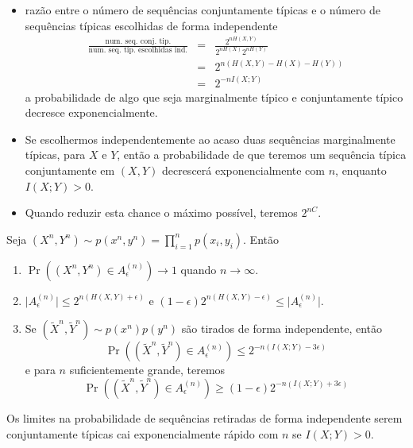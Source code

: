 \begin{frame}[allowframebreaks]
  \begin{itemize}
  \item razão entre o número de sequências conjuntamente típicas e o número de sequências típicas escolhidas de forma independente 
	\begin{eqnarray}
	\frac{\text{num. seq. conj. tip.}}{\text{num. seq. tip. escolhidas ind.}} &=& \frac{2^{nH(X,Y)}}{2^{nH(X)}2^{nH(Y)}} \nonumber \\
		&=& 2^{n(H(X,Y)-H(X)-H(Y))} \nonumber \\
		&=& 2^{-nI(X;Y)}
	\end{eqnarray}
  a probabilidade de algo que seja marginalmente típico e conjuntamente típico decresce exponencialmente.
  \item Se escolhermos independentemente ao acaso duas sequências marginalmente típicas, para $X$ e $Y$, então
	a probabilidade de que teremos um sequência típica conjuntamente em $(X,Y)$ decrescerá exponencialmente com $n$,
	enquanto $I(X;Y) > 0$.
  \item Quando reduzir esta chance o máximo possível, teremos $2^{nC}$.
  \end{itemize}

  \framebreak

  \begin{theorem}
  Seja $(X^n,Y^n) \sim p(x^n,y^n) = \prod_{i=1}^n p(x_i , y_i)$. Então
  \begin{enumerate}
  \item $\Pr \left( (X^n,Y^n) \in A_{\epsilon}^{(n)} \right) \rightarrow 1$ quando $n \rightarrow \infty$.
  \item $\vert A_{\epsilon}^{(n)} \vert \leq 2^{n(H(X,Y)+\epsilon)}$ e $(1-\epsilon) 2^{n(H(X,Y)-\epsilon)} \leq \vert A_{\epsilon}^{(n)} \vert$.
  \item Se $(\tilde{X}^n, \tilde{Y}^n) \sim p(x^n)p(y^n)$ são tirados de forma independente, então
	\begin{equation}
	\Pr \left( (\tilde{X}^n, \tilde{Y}^n) \in A_{\epsilon}^{(n)} \right) \leq 2^{-n(I(X;Y)-3\epsilon)}
	\end{equation}
	e para $n$ suficientemente grande, teremos
        \begin{equation}
        \Pr \left( (\tilde{X}^n, \tilde{Y}^n) \in A_{\epsilon}^{(n)} \right) \geq (1-\epsilon)2^{-n(I(X;Y)+3\epsilon)}
        \end{equation}
  \end{enumerate}
  \end{theorem}
  Os limites na probabilidade de sequências retiradas de forma independente serem conjuntamente típicas 
  cai exponencialmente rápido com $n$ se $I(X;Y) > 0$.


\end{frame}
